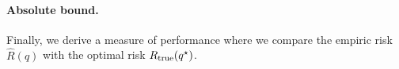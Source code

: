 

\paragraph{Absolute bound.}
Finally, we derive a measure of performance where we compare the empiric risk
$\hat R(\hat q)$ with the optimal risk $R_{\mathrm{true}}(q^\star)$.

